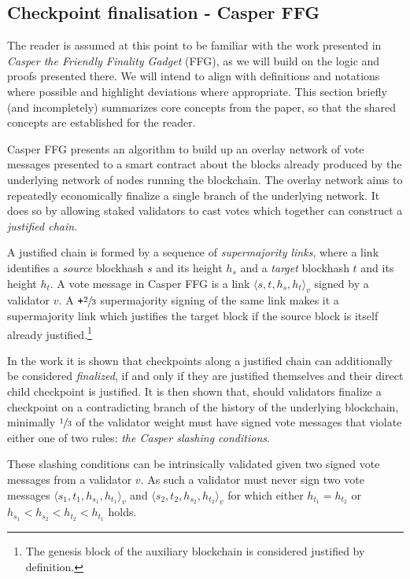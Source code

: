\documentclass[12pt,a4paper]{article}
\begin{document}
\subsection{Checkpoint finalisation - Casper FFG}
The reader is assumed at this point to be familiar with the work presented in \textit{Casper the Friendly Finality Gadget}\cite{casperffg} (FFG), as we will build on the logic and proofs presented there.
We will intend to align with definitions and notations where possible and highlight deviations where appropriate.
This section briefly (and incompletely) summarizes core concepts from the paper, so that the shared concepts are established for the reader.

Casper FFG presents an algorithm to build up an overlay network of vote messages presented to a smart contract about the blocks already produced by the underlying network of nodes running the blockchain.
The overlay network aims to repeatedly economically finalize a single branch of the underlying network.
It does so by allowing staked validators to cast votes which together can construct a \emph{justified chain}.

A justified chain is formed by a sequence of \emph{supermajority links}, where a link identifies a \emph{source} blockhash $s$ and its height $h_s$ and a \emph{target} blockhash $t$ and its height $h_t$.
A vote message in Casper FFG is a link $\langle s, t, h_s, h_t\rangle_v$ signed by a validator $v$.
A $\texttt{+}\sfrac{2}{3}$ supermajority signing of the same link makes it a supermajority link which justifies the target block if the source block is itself already justified.\footnote{
	The genesis block of the auxiliary blockchain is considered justified by definition.
}

In the work it is shown that checkpoints along a justified chain can additionally be considered \emph{finalized}, if and only if they are justified themselves and their direct child checkpoint is justified.
It is then shown that, should validators finalize a checkpoint on a contradicting branch of the history of the underlying blockchain, minimally $\sfrac{1}{3}$ of the validator weight must have signed vote messages that violate either one of two rules: \emph{the Casper slashing conditions}.

These slashing conditions can be intrinsically validated given two signed vote messages from a validator $v$.
As such a validator must never sign two vote messages $\langle s_1, t_1, h_{s_1}, h_{t_1}\rangle_v$ and $\langle s_2, t_2, h_{s_2}, h_{t_2}\rangle_v$ for which either $h_{t_1} = h_{t_2}$ or $h_{s_1} < h_{s_2} < h_{t_2} < h_{t_1}$ holds.
\end{document}
